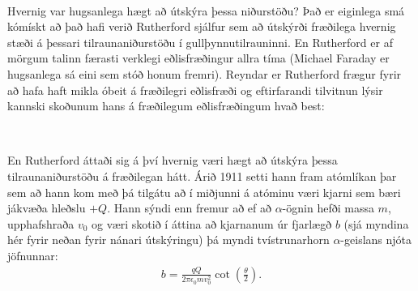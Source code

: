 \begin{tcolorbox}

 \\

\vspace{-0.3cm}
\end{tcolorbox}

Hvernig var hugsanlega hægt að útskýra þessa niðurstöðu? Það er eiginlega smá kómískt að það hafi verið Rutherford sjálfur sem að útskýrði fræðilega hvernig stæði á þessari tilraunaniðurstöðu í gullþynnutilrauninni. En Rutherford er af mörgum talinn færasti verklegi eðlisfræðingur allra tíma (Michael Faraday er hugsanlega sá eini sem stóð honum fremri). Reyndar er Rutherford frægur fyrir að hafa haft mikla óbeit á fræðilegri eðlisfræði og eftirfarandi tilvitnun lýsir kannski skoðunum hans á fræðilegum eðlisfræðingum hvað best:

\begin{tcolorbox}

 \\

\vspace{-0.3cm}
\end{tcolorbox}

En Rutherford áttaði sig á því hvernig væri hægt að útskýra þessa tilraunaniðurstöðu á fræðilegan hátt. Árið 1911 setti hann fram atómlíkan þar sem að hann kom með þá tilgátu að í miðjunni á atóminu væri kjarni sem bæri jákvæða hleðslu $+Q$. Hann sýndi enn fremur að ef að $\alpha$-ögnin hefði massa $m$, upphafshraða $v_0$ og væri skotið í áttina að kjarnanum úr fjarlægð $b$ (sjá myndina hér fyrir neðan fyrir nánari útskýringu) þá myndi tvístrunarhorn $\alpha$-geislans njóta jöfnunnar:
\begin{align*}
    b = \frac{qQ}{2\pi \epsilon_0 mv_0^2} \cot(\frac{\theta}{2}).
\end{align*}

